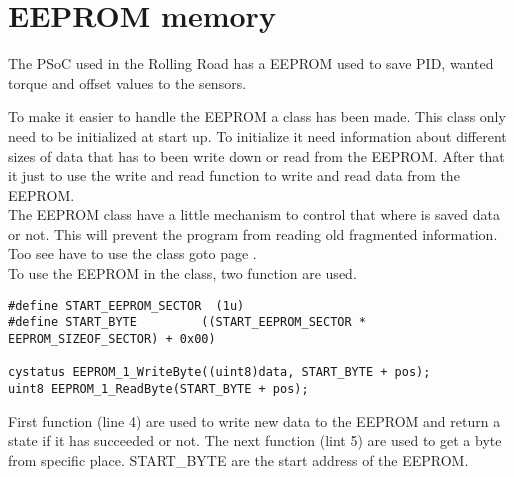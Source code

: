 \newpage
\section{EEPROM memory}
The PSoC used in the Rolling Road has a EEPROM used to save PID, wanted torque and offset values to the sensors.

To make it easier to handle the EEPROM a class has been made. This class only need to be initialized at start up. To initialize it need information about different sizes of data that has to been write down or read from the EEPROM. After that it just to use the write and read function to write and read data from the EEPROM.\\ 
The EEPROM class have a little mechanism to control that where is saved data or not. This will prevent the program from reading old fragmented information.\\
Too see have to use the class goto page \pageref{table:Class_description_EEPROM_RR_PSoC}. \\
To use the EEPROM in the class, two function are used.

\lstset{language=C}
\begin{lstlisting}
#define START_EEPROM_SECTOR  (1u)
#define START_BYTE         ((START_EEPROM_SECTOR * EEPROM_SIZEOF_SECTOR) + 0x00)

cystatus EEPROM_1_WriteByte((uint8)data, START_BYTE + pos);
uint8 EEPROM_1_ReadByte(START_BYTE + pos);
\end{lstlisting}

First function (line 4) are used to write new data to the EEPROM and return a state if it has succeeded or not. The next function (lint 5) are used to get a byte from specific place. START\_BYTE are the start address of the EEPROM. 
